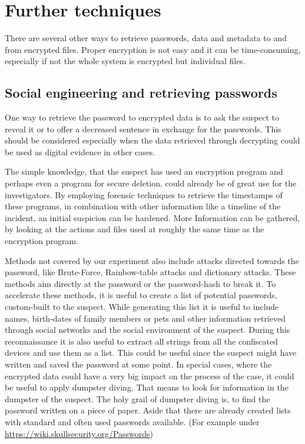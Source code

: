 \section{Further techniques}
There are several other ways to retrieve passwords, data and metadata to and from encrypted files. Proper encryption is not easy and it can be time-consuming, especially if not the whole system is encrypted but individual files.
\subsection{Social engineering and retrieving passwords}
One way to retrieve the password to encrypted data is to ask the suspect to reveal it or to offer a decreased sentence in exchange for the passwords.
This should be considered especially when the data retrieved through decrypting could be used as digital evidence in other cases.

The simple knowledge, that the suspect has used an encryption program and perhaps even a program for secure deletion, could already be of great use for the investigators. By employing forensic techniques to retrieve the timestamps of these programs, in combination with other information like a timeline of the incident, an initial suspicion can be hardened. More Information can be gathered, by looking at the actions and files used at roughly the same time as the encryption program.

Methods not covered by our experiment also include attacks directed towards the password, like Brute-Force, Rainbow-table attacks and dictionary attacks. These methods aim directly at the password or the password-hash to break it. To accelerate these methods, it is useful to create a list of potential passwords, custom-built to the suspect. While generating this list it is useful to include names, birth-dates of family members or pets and other information retrieved through social networks and the social environment of the suspect. During this reconnaissance it is also useful to extract all strings from all the confiscated devices and use them as a list. This could be useful since the suspect might have written and saved the password at some point. In special cases, where the encrypted data could have a very big impact on the process of the case, it could be useful to apply dumpster diving.  That means to look for information in the dumpster of the suspect. The holy grail of dumpster diving is, to find the password written on a piece of paper. Aside that there are already created lists with standard and often used passwords available.
(For example under \url{https://wiki.skullsecurity.org/Passwords})

